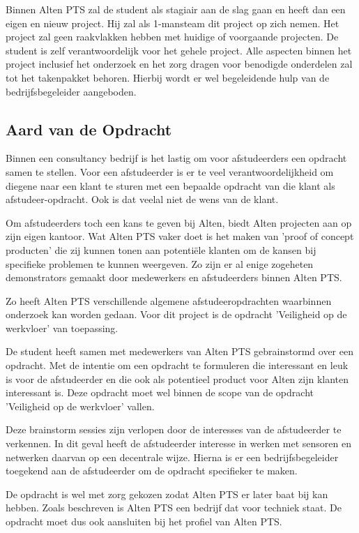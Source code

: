 \documentclass{../local}
\begin{document}
Binnen Alten PTS zal de student als stagiair aan de slag gaan en heeft dan een eigen en nieuw project. Hij zal als 1-mansteam dit project op zich nemen. Het project zal geen raakvlakken hebben met huidige of voorgaande projecten. De student is zelf verantwoordelijk voor het gehele project. Alle aspecten binnen het project inclusief het onderzoek en het zorg dragen voor benodigde onderdelen zal tot het takenpakket behoren. Hierbij wordt er wel begeleidende hulp van de bedrijfsbegeleider aangeboden.

\subsection{Aard van de Opdracht}

Binnen een consultancy bedrijf is het lastig om voor afstudeerders een opdracht samen te stellen. Voor een afstudeerder is er te veel verantwoordelijkheid om diegene naar een klant te sturen met een bepaalde opdracht van die klant als afstudeer-opdracht. Ook is dat veelal niet de wens van de klant. 

Om afstudeerders toch een kans te geven bij Alten, biedt Alten projecten aan op zijn eigen kantoor. Wat Alten PTS vaker doet is het maken van 'proof of concept producten' die zij kunnen tonen aan potentiële klanten om de kansen bij specifieke problemen te kunnen weergeven. Zo zijn er al enige zogeheten demonstrators gemaakt door medewerkers en afstudeerders binnen Alten PTS.

Zo heeft Alten PTS verschillende algemene afstudeeropdrachten waarbinnen onderzoek kan worden gedaan. Voor dit project is de opdracht 'Veiligheid op de werkvloer' van toepassing.

De student heeft samen met medewerkers van Alten PTS gebrainstormd over een opdracht. Met de intentie om een opdracht te formuleren die interessant en leuk is voor de afstudeerder en die ook als potentieel product voor Alten zijn klanten interessant is. Deze opdracht moet wel binnen de scope van de opdracht 'Veiligheid op de werkvloer' vallen.

Deze brainstorm sessies zijn verlopen door de interesses van de afstudeerder te verkennen. In dit geval heeft de afstudeerder interesse in werken met sensoren en netwerken daarvan op een decentrale wijze. Hierna is er een bedrijfsbegeleider toegekend aan de afstudeerder om de opdracht specifieker te maken.

De opdracht is wel met zorg gekozen zodat Alten PTS er later baat bij kan hebben. Zoals beschreven is Alten PTS een bedrijf dat voor techniek staat. De opdracht moet dus ook aansluiten bij het profiel van Alten PTS.
\end{document}
